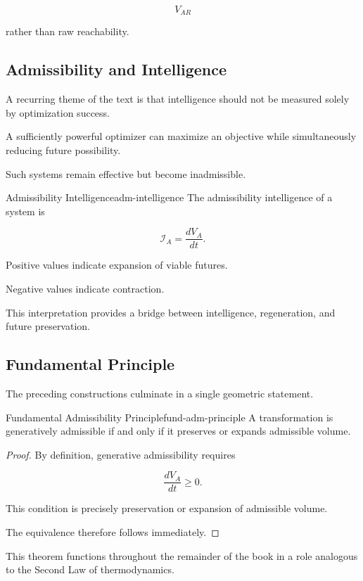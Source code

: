 \documentclass[12pt,twoside,openright]{book}
\begin{document}
\[
V_{AR}
\]

rather than raw reachability.

\subsection{Admissibility and Intelligence}

A recurring theme of the text is that intelligence should
not be measured solely by optimization success.

A sufficiently powerful optimizer can maximize an
objective while simultaneously reducing future
possibility.

Such systems remain effective but become
inadmissible.

\begin{definition}{Admissibility Intelligence}{adm-intelligence}
The admissibility intelligence of a system is

\[
\mathcal I_A
=

\frac{dV_A}{dt}.
\]
\end{definition}

Positive values indicate expansion of viable futures.

Negative values indicate contraction.

This interpretation provides a bridge between
intelligence, regeneration, and future preservation.

\subsection{Fundamental Principle}

The preceding constructions culminate in a single
geometric statement.

\begin{theorem}{Fundamental Admissibility Principle}{fund-adm-principle}
A transformation is generatively admissible if and only if
it preserves or expands admissible volume.
\end{theorem}

\begin{proof}
By definition, generative admissibility requires

\[
\frac{dV_A}{dt}
\ge0.
\]

This condition is precisely preservation or expansion of
admissible volume.

The equivalence therefore follows immediately.
\end{proof}

This theorem functions throughout the remainder of the
book in a role analogous to the Second Law of
thermodynamics.
\end{document}
